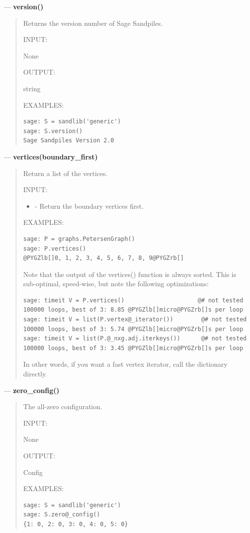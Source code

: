 \documentclass[letterpaper,10pt,english]{manual}
\begin{document}
---
\hypertarget{version}{}
\textbf{version()}
\begin{quote}

Returns the version number of Sage Sandpiles.

INPUT:

None

OUTPUT:

string

EXAMPLES:

\begin{Verbatim}[commandchars=@\[\]]
sage: S = sandlib('generic')
sage: S.version()
Sage Sandpiles Version 2.0
\end{Verbatim}
\end{quote}

---
\hypertarget{vertices-boundary-first}{}
\textbf{vertices(boundary\_first)}
\begin{quote}

Return a list of the vertices.

INPUT:
\begin{itemize}
\item {} 
 - Return the boundary vertices
first.

\end{itemize}

EXAMPLES:

\begin{Verbatim}[commandchars=@\[\]]
sage: P = graphs.PetersenGraph()
sage: P.vertices()
@PYGZlb[]0, 1, 2, 3, 4, 5, 6, 7, 8, 9@PYGZrb[]
\end{Verbatim}

Note that the output of the vertices() function is always sorted.
This is sub-optimal, speed-wise, but note the following
optimizations:

\begin{Verbatim}[commandchars=@\[\]]
sage: timeit V = P.vertices()                     @# not tested
100000 loops, best of 3: 8.85 @PYGZlb[]micro@PYGZrb[]s per loop
sage: timeit V = list(P.vertex@_iterator())        @# not tested
100000 loops, best of 3: 5.74 @PYGZlb[]micro@PYGZrb[]s per loop
sage: timeit V = list(P.@_nxg.adj.iterkeys())      @# not tested
100000 loops, best of 3: 3.45 @PYGZlb[]micro@PYGZrb[]s per loop
\end{Verbatim}

In other words, if you want a fast vertex iterator, call the
dictionary directly.
\end{quote}

---
\hypertarget{zero-config}{}
\textbf{zero\_config()}
\begin{quote}

The all-zero configuration.

INPUT:

None

OUTPUT:

Config

EXAMPLES:

\begin{Verbatim}[commandchars=@\[\]]
sage: S = sandlib('generic')
sage: S.zero@_config()
{1: 0, 2: 0, 3: 0, 4: 0, 5: 0}
\end{Verbatim}
\end{quote}
\end{document}
